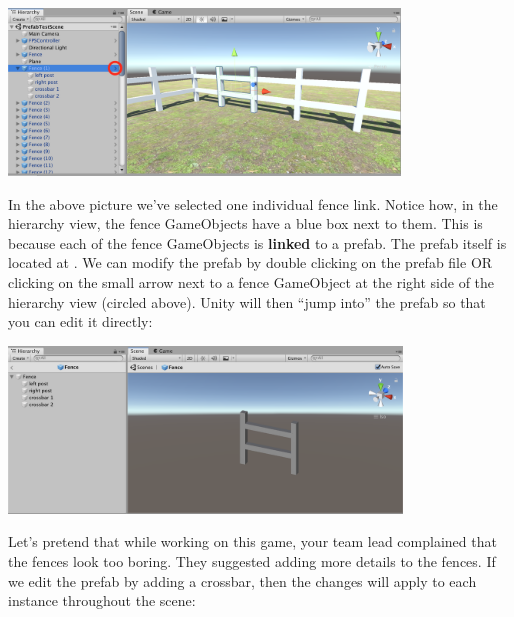 \documentclass[11pt]{article}
\begin{document}
\begin{center}
\includegraphics[height=12em]{prefabs-1}
\end{center}

In the above picture we've selected one individual fence link.  Notice how, in the hierarchy view,
the fence GameObjects have a blue box next to them.  This is because each of the fence GameObjects
is \textbf{linked} to a prefab.  The prefab itself is located at 
.  We can modify the prefab by double clicking
on the prefab file OR clicking on the small arrow next to a fence GameObject at the right side of 
the hierarchy view (circled above).  Unity will then ``jump into'' the prefab so that you can edit
it directly:

\begin{center}
\includegraphics[height=12em]{prefabs-2}
\end{center}

Let's pretend that while working on this game, your team lead complained that the fences look too
boring.  They suggested adding more details to the fences.  If we edit the prefab by adding a crossbar,
then the changes will apply to each instance throughout the scene:
\end{document}

